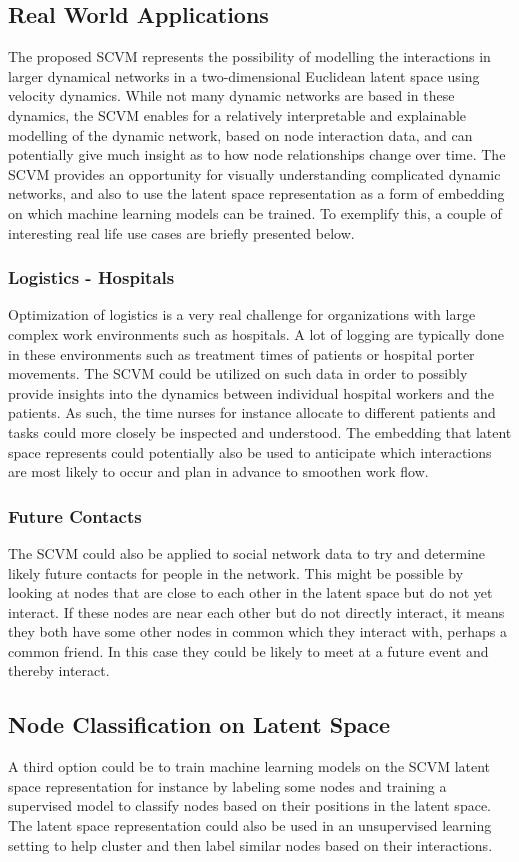 \subsection{Real World Applications}
\label{sec:Discussion:UseCases}
The proposed SCVM represents the possibility of modelling the interactions in larger dynamical networks in a two-dimensional Euclidean latent space using velocity dynamics. 
While not many dynamic networks are based in these dynamics, the SCVM enables for a relatively interpretable and explainable modelling of the dynamic network, based on node interaction data, and can potentially give much insight as to how node relationships change over time.
The SCVM provides an opportunity for visually understanding complicated dynamic networks, and also to use the latent space representation as a form of embedding on which machine learning models can be trained.
To exemplify this, a couple of interesting real life use cases are briefly presented below.

\subsubsection{Logistics - Hospitals}
\label{sec:Discussion:UseCases:Hospitals}
Optimization of logistics is a very real challenge for organizations with large complex work environments such as hospitals. 
A lot of logging are typically done in these environments such as treatment times of patients or hospital porter movements. 
The SCVM could be utilized on such data in order to possibly provide insights into the dynamics between individual hospital workers and the patients.
As such, the time nurses for instance allocate to different patients and tasks could more closely be inspected and understood.
The embedding that latent space represents could potentially also be used to anticipate which interactions are most likely to occur and plan in advance to smoothen work flow.


\subsubsection{Future Contacts}
\label{sec:Discussion:UseCases:Marketing}
The SCVM could also be applied to social network data to try and determine likely future contacts for people in the network. 
This might be possible by looking at nodes that are close to each other in the latent space but do not yet interact. 
If these nodes are near each other but do not directly interact, it means they both have some other nodes in common which they interact with, perhaps a common friend. 
In this case they could be likely to meet at a future event and thereby interact.

\subsection{Node Classification on Latent Space}
A third option could be to train machine learning models on the SCVM latent space representation for instance by labeling some nodes and training a supervised model to classify nodes based on their positions in the latent space. 
The latent space representation could also be used in an unsupervised learning setting to help cluster and then label similar nodes based on their interactions.